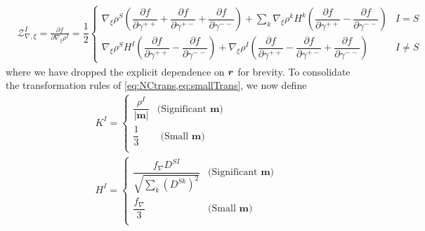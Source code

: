 \begin{subequations}
\label{eq:ZgammaVar}
\begin{align}
&\mathcal{Z}^I_{\nabla,\xi} = \frac{\partial f}{\partial \nabla_\xi \rho^I} = \dfrac{1}{2} \begin{cases}
                                                          \nabla_\xi\rho^S    \left(  \dfrac{\partial f}{\partial \gamma^{++}} + \dfrac{\partial f}{\partial \gamma^{+-}} + \dfrac{\partial f}{\partial \gamma^{--}} \right)  
                                                          + \sum_k \nabla_\xi \rho^k H^k 
                                                          \left( \dfrac{\partial f}{\partial \gamma^{++}} - \dfrac{\partial f}{\partial \gamma^{--}} 
                                                          \right)                                                          
                                                          & I= S \\[8pt]                                                                                                        
                                                          \nabla_\xi\rho^S H^I  \left( \dfrac{\partial f}{\partial \gamma^{++}} - \dfrac{\partial f}{\partial \gamma^{--}} \right) 
                                                          + \nabla_\xi\rho^I
                                                          \left(\dfrac{\partial f}{\partial \gamma^{++}} - \dfrac{\partial f}{\partial \gamma^{+-}} + \dfrac{\partial f}{\partial \gamma^{--}}
                                                           \right)
                                                          & I \neq S
                                                        \end{cases}                                                                                                                                     
\end{align}
\end{subequations}
where we have dropped the explicit dependence on $\boldsymbol{r}$ for brevity. To consolidate the transformation rules of 
\cref{eq:NCtrans,eq:smallTrans}, we now define
\begin{subequations}
\begin{align}
&K^I = 
\begin{cases}
  \dfrac{\rho^I}{\vert \mathbf{m} \vert} & \text{(Significant }\mathbf{m}\text{)} \\[20pt]
  \dfrac{1}{3} & \text{ (Small }\mathbf{m}\text{)} \\[12pt]
\end{cases}\\
&H^I = 
\begin{cases}
  \dfrac{f_\nabla D^{SI} }{\sqrt{\sum_k \left(D^{Sk}\right)^2   }} & \text{(Significant }\mathbf{m}\text{)} \\[20pt]
  \dfrac{f_\nabla}{3} & \text{(Small }\mathbf{m}\text{)} \\[12pt]
\end{cases}
\end{align}
\end{subequations}


